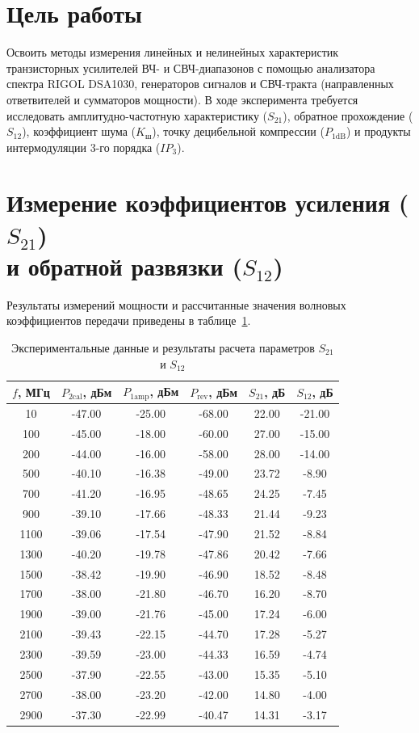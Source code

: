 \section{Цель работы}

Освоить методы измерения линейных и нелинейных характеристик транзисторных усилителей ВЧ- и СВЧ-диапазонов с помощью анализатора спектра RIGOL DSA1030, генераторов сигналов и СВЧ-тракта (направленных ответвителей и сумматоров мощности). В ходе эксперимента требуется исследовать амплитудно-частотную характеристику ($S_{21}$), обратное прохождение ($S_{12}$), коэффициент шума ($K_{\text{ш}}$), точку децибельной компрессии ($P_{1\text{dB}}$) и продукты интермодуляции 3-го порядка ($IP_3$).

\section{Измерение коэффициентов усиления ($S_{21}$)\\ и обратной развязки ($S_{12}$)}

Результаты измерений мощности и рассчитанные значения волновых коэффициентов передачи приведены в таблице~\ref{tab:s_params}.

\begin{table}[H]
\centering
\caption{Экспериментальные данные и результаты расчета параметров $S_{21}$ и $S_{12}$}
\label{tab:s_params}
\small
\begin{tabular}{|c|c|c|c|c|c|}
\hline
$f$, МГц & $P_{2\text{cal}}$, дБм & $P_{1\text{amp}}$, дБм & $P_{\text{rev}}$, дБм & $S_{21}$, дБ & $S_{12}$, дБ \\
\hline
10   & -47.00 & -25.00 & -68.00 & 22.00 & -21.00 \\
100  & -45.00 & -18.00 & -60.00 & 27.00 & -15.00 \\
200  & -44.00 & -16.00 & -58.00 & 28.00 & -14.00 \\
500  & -40.10 & -16.38 & -49.00 & 23.72 & -8.90  \\
700  & -41.20 & -16.95 & -48.65 & 24.25 & -7.45  \\
900  & -39.10 & -17.66 & -48.33 & 21.44 & -9.23  \\
1100 & -39.06 & -17.54 & -47.90 & 21.52 & -8.84  \\
1300 & -40.20 & -19.78 & -47.86 & 20.42 & -7.66  \\
1500 & -38.42 & -19.90 & -46.90 & 18.52 & -8.48  \\
1700 & -38.00 & -21.80 & -46.70 & 16.20 & -8.70  \\
1900 & -39.00 & -21.76 & -45.00 & 17.24 & -6.00  \\
2100 & -39.43 & -22.15 & -44.70 & 17.28 & -5.27  \\
2300 & -39.59 & -23.00 & -44.33 & 16.59 & -4.74  \\
2500 & -37.90 & -22.55 & -43.00 & 15.35 & -5.10  \\
2700 & -38.00 & -23.20 & -42.00 & 14.80 & -4.00  \\
2900 & -37.30 & -22.99 & -40.47 & 14.31 & -3.17  \\
\hline
\end{tabular}
\end{table}

